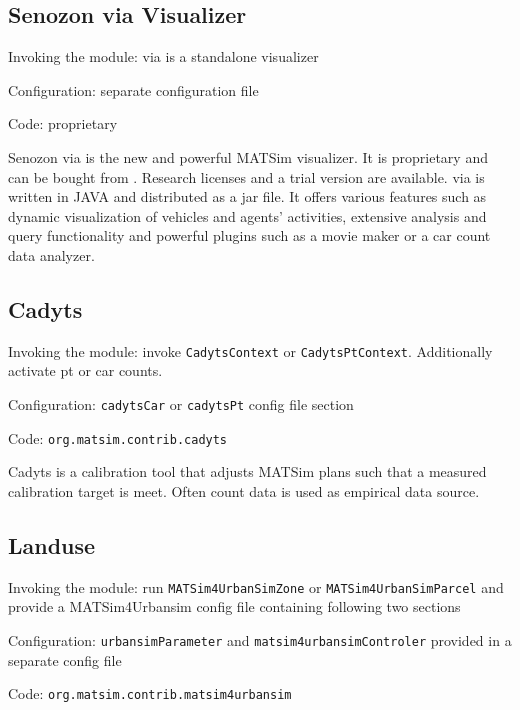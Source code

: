 \subsection{Senozon via Visualizer}
\label{sec:via}
\begin{compactitem}
\item Invoking the module: via is a standalone visualizer
\item Configuration: separate configuration file
\item Code: proprietary
\end{compactitem}

Senozon via is the new and powerful MATSim visualizer. It is proprietary and can be bought from \citep[][]{senozonVIA_Webpage_2014}. Research licenses and a trial version are available. via is written in JAVA and distributed as a jar file. It offers various features such as dynamic visualization of vehicles and agents' activities, extensive analysis and query functionality and powerful plugins such as a movie maker or a car count data analyzer.

\subsection{Cadyts}
\label{sec:cadyts}
\begin{compactitem}
\item Invoking the module: invoke \lstinline|CadytsContext| or \lstinline|CadytsPtContext|. Additionally activate pt or car counts. 
\item Configuration: \lstinline|cadytsCar| or \lstinline|cadytsPt| config file section
\item Code: \lstinline|org.matsim.contrib.cadyts|
\end{compactitem}

Cadyts \citep[][]{FloetteroedEtAl_TechRep_TRANSPOR_2008} is a calibration tool that adjusts MATSim plans such that a measured calibration target is meet. Often count data is used as empirical data source.

\subsection{Landuse}
\label{sec:landuse}
\begin{compactitem}
\item Invoking the module: run \lstinline|MATSim4UrbanSimZone| or \lstinline|MATSim4UrbanSimParcel| and provide a MATSim4Urbansim config file containing following two sections
\item Configuration: \lstinline|urbansimParameter| and \lstinline|matsim4urbansimControler| provided in a separate config file
\item Code: \lstinline|org.matsim.contrib.matsim4urbansim|
\end{compactitem}


